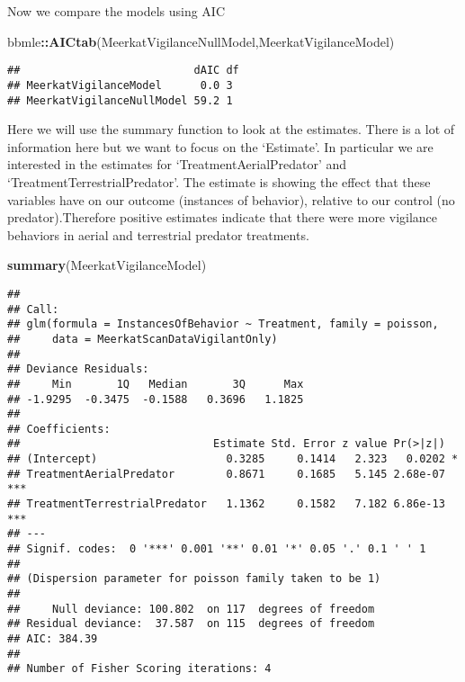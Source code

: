 \documentclass[]{book}
\newenvironment{Shaded}{\begin{snugshade}}{\end{snugshade}}
\newcommand{\KeywordTok}[1]{\textcolor[rgb]{0.13,0.29,0.53}{\textbf{#1}}}
\newcommand{\NormalTok}[1]{#1}
\newcommand{\OperatorTok}[1]{\textcolor[rgb]{0.81,0.36,0.00}{\textbf{#1}}}
\begin{document}
Now we compare the models using AIC

\begin{Shaded}
\begin{Highlighting}[]
\NormalTok{bbmle}\OperatorTok{::}\KeywordTok{AICtab}\NormalTok{(MeerkatVigilanceNullModel,MeerkatVigilanceModel)}
\end{Highlighting}
\end{Shaded}

\begin{verbatim}
##                           dAIC df
## MeerkatVigilanceModel      0.0 3 
## MeerkatVigilanceNullModel 59.2 1
\end{verbatim}

Here we will use the summary function to look at the estimates. There is a lot of information here but we want to focus on the `Estimate'. In particular we are interested in the estimates for `TreatmentAerialPredator' and `TreatmentTerrestrialPredator'. The estimate is showing the effect that these variables have on our outcome (instances of behavior), relative to our control (no predator).Therefore positive estimates indicate that there were more vigilance behaviors in aerial and terrestrial predator treatments.

\begin{Shaded}
\begin{Highlighting}[]
\KeywordTok{summary}\NormalTok{(MeerkatVigilanceModel)}
\end{Highlighting}
\end{Shaded}

\begin{verbatim}
## 
## Call:
## glm(formula = InstancesOfBehavior ~ Treatment, family = poisson, 
##     data = MeerkatScanDataVigilantOnly)
## 
## Deviance Residuals: 
##     Min       1Q   Median       3Q      Max  
## -1.9295  -0.3475  -0.1588   0.3696   1.1825  
## 
## Coefficients:
##                              Estimate Std. Error z value Pr(>|z|)    
## (Intercept)                    0.3285     0.1414   2.323   0.0202 *  
## TreatmentAerialPredator        0.8671     0.1685   5.145 2.68e-07 ***
## TreatmentTerrestrialPredator   1.1362     0.1582   7.182 6.86e-13 ***
## ---
## Signif. codes:  0 '***' 0.001 '**' 0.01 '*' 0.05 '.' 0.1 ' ' 1
## 
## (Dispersion parameter for poisson family taken to be 1)
## 
##     Null deviance: 100.802  on 117  degrees of freedom
## Residual deviance:  37.587  on 115  degrees of freedom
## AIC: 384.39
## 
## Number of Fisher Scoring iterations: 4
\end{verbatim}
\end{document}
